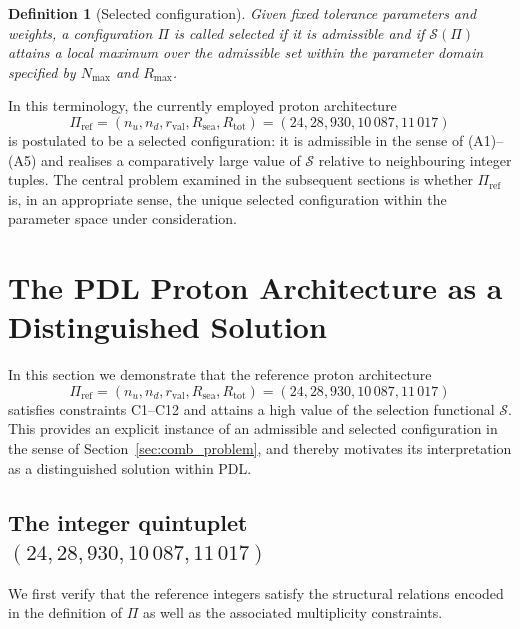 \documentclass[11pt,a4paper]{article}
\newtheorem{definition}{Definition}
\begin{document}
\begin{definition}[Selected configuration]
Given fixed tolerance parameters and weights, a configuration $\Pi$ is called selected if it is admissible and if $\mathcal{S}(\Pi)$ attains a local maximum over the admissible set within the parameter domain specified by $N_{\max}$ and $R_{\max}$.
\end{definition}

In this terminology, the currently employed proton architecture
\begin{equation}
\Pi_{\mathrm{ref}} = (n_u,n_d,r_{\mathrm{val}},R_{\mathrm{sea}},R_{\mathrm{tot}}) = (24,28,930,10\,087,11\,017)
\end{equation}
is postulated to be a selected configuration: it is admissible in the sense of (A1)–(A5) and realises a comparatively large value of $\mathcal{S}$ relative to neighbouring integer tuples. The central problem examined in the subsequent sections is whether $\Pi_{\mathrm{ref}}$ is, in an appropriate sense, the unique selected configuration within the parameter space under consideration.

\section{The PDL Proton Architecture as a Distinguished Solution}
\label{sec:current_solution}

In this section we demonstrate that the reference proton architecture
\begin{equation}
\Pi_{\mathrm{ref}} = (n_u,n_d,r_{\mathrm{val}},R_{\mathrm{sea}},R_{\mathrm{tot}}) = (24,28,930,10\,087,11\,017)
\end{equation}
satisfies constraints C1–C12 and attains a high value of the selection functional $\mathcal{S}$. This provides an explicit instance of an admissible and selected configuration in the sense of Section~\ref{sec:comb_problem}, and thereby motivates its interpretation as a distinguished solution within PDL.\cite{LaubscherPDLFull2026,LaubscherLDP2026,LaubscherIMRadPDL2026,LaubscherDerivationAlpha2026}

\subsection{The integer quintuplet \texorpdfstring{$(24,28,930,10\,087,11\,017)$}{(24,28,930,10087,11017)}}

We first verify that the reference integers satisfy the structural relations encoded in the definition of $\Pi$ as well as the associated multiplicity constraints.
\end{document}
